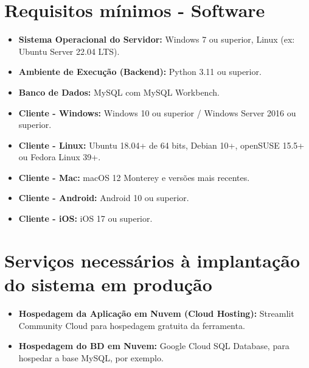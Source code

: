 \section{Requisitos mínimos - Software}
\begin{itemize}
    \item \textbf{Sistema Operacional do Servidor:} Windows 7 ou superior, Linux (ex: Ubuntu Server 22.04 LTS).
    \item \textbf{Ambiente de Execução (Backend):} Python 3.11 ou superior.
    \item \textbf{Banco de Dados:}  MySQL com MySQL Workbench.
    \item \textbf{Cliente - Windows:} Windows 10 ou superior / Windows Server 2016 ou superior.
    \item \textbf{Cliente - Linux:} Ubuntu 18.04+ de 64 bits, Debian 10+, openSUSE 15.5+ ou Fedora Linux 39+.
    \item \textbf{Cliente - Mac:} macOS 12 Monterey e versões mais recentes.
    \item \textbf{Cliente - Android:} Android 10 ou superior.
    \item \textbf{Cliente - iOS:} iOS 17 ou superior.
\end{itemize}

\section{Serviços necessários à implantação do sistema em produção}
\begin{itemize}
    \item \textbf{Hospedagem da Aplicação em Nuvem (Cloud Hosting):} Streamlit Community Cloud para hospedagem gratuita da ferramenta.
    \item \textbf{Hospedagem do BD em Nuvem:} Google Cloud SQL Database, para hospedar a base MySQL, por exemplo.
\end{itemize}
